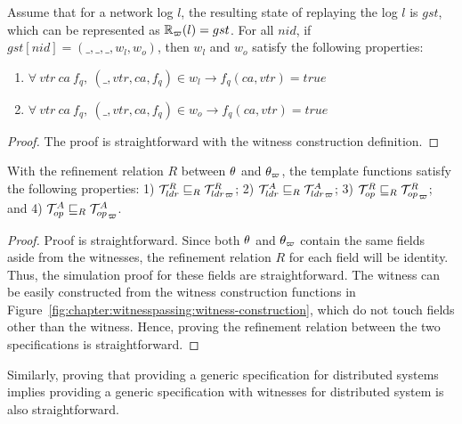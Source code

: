\begin{theorem}\label{thm:witness-invariant}
Assume that for a network log $l$, the resulting state of replaying the log $l$ 
	is $gst$, which can be represented as $\mathbb{R}_\varpi(l) = gst$. 
For all $nid$, if $gst[nid] = (\_, \_, \_, w_l, w_o)$, then $w_l$ and $w_o$ satisfy the following properties:
\begin{enumerate}
\item $\forall\ vtr\ ca\ f_q, \ (\_, vtr, ca, f_q) \in w_l \rightarrow f_q(ca, vtr) = true$
\item $\forall\ vtr\ ca\ f_q, \ (\_, vtr, ca, f_q) \in w_o \rightarrow f_q(ca, vtr) = true$
\end{enumerate}
\end{theorem}

\begin{proof}
The proof is straightforward with the witness construction definition.
\end{proof}

\begin{theorem}\label{theorem:chapter:witnesspassing:spec-refine}
With the refinement relation $R$ between $\theta$ and $\theta_\varpi$, 
the template functions satisfy the following properties:
1) $\mathcal{T}^{R}_{ldr}  \sqsubseteq_{R} {\mathcal{T}^{R}_{ldr}}_{\varpi} $; 
2) $\mathcal{T}^{A}_{ldr}  \sqsubseteq_{R} {\mathcal{T}^{A}_{ldr}}_{\varpi} $; 
3) $\mathcal{T}^{R}_{op}  \sqsubseteq_{R} {\mathcal{T}^{R}_{op}}_{\varpi} $; and
4) $\mathcal{T}^{A}_{op}  \sqsubseteq_{R} {\mathcal{T}^{A}_{op}}_{\varpi}$.
\end{theorem}

\begin{proof}
Proof is straightforward. 
Since both $\theta$ and $\theta_\varpi$ contain the same fields aside from
the witnesses, the refinement relation $R$ for each field will be identity.
Thus, the simulation proof for these fields are straightforward. 
The witness can be easily constructed from the witness construction functions
in Figure~\ref{fig:chapter:witnesspassing:witness-construction}, which do not touch fields other
than the witness. 
Hence, proving the refinement relation between the two specifications is
straightforward.
\end{proof}

Similarly, proving that providing a generic specification for distributed
systems implies providing a generic specification with witnesses for distributed
system is also straightforward.



